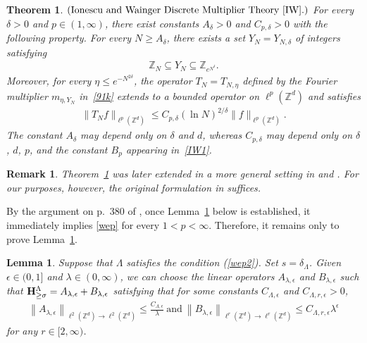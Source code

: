 \documentclass[10pt,a4paper]{amsart}
\newtheorem{theorem}{Theorem}\numberwithin{theorem}{section}
\newtheorem{lemma}{Lemma}\numberwithin{lemma}{section}
\newtheorem{remark}{Remark}\numberwithin{remark}{section}
\numberwithin{equation}{section}
\begin{document}
\begin{theorem}\label{lem82}
$(\text{Ionescu and Wainger Discrete Multiplier Theory \cite{IW}.})$ 
For every $\delta>0$ and $p\in(1,\infty)$, there exist constants
$A_{\delta}>0$ and $C_{p,\delta}>0$ with the following property.
For every $N\ge A_{\delta}$, there exists a set
$Y_N=Y_{N,\delta}$ of integers satisfying
\begin{align*}
	\mathbb{Z}_N
	\subseteq Y_N
	\subseteq \mathbb{Z}_{e^{N^\delta}}.
\end{align*}
Moreover, for every $\eta\le e^{-N^{2\delta}}$, the operator
$T_N=T_{N,\eta}$ defined by the Fourier multiplier
$m_{\eta,Y_N}$ in~\eqref{91k} extends to a bounded operator on
$\ell^p(\mathbb{Z}^d)$ and satisfies
\begin{align*}
	\|T_N f\|_{\ell^p(\mathbb{Z}^d)}
	\le
	C_{p,\delta}(\ln N)^{2/\delta}
	\|f\|_{\ell^p(\mathbb{Z}^d)}.
\end{align*}
The constant $A_{\delta}$ may depend only on $\delta$ and $d$,
whereas $C_{p,\delta}$ may depend only on $\delta$, $d$, $p$,
and the constant $B_p$ appearing in~\eqref{IW1}.
\end{theorem}

\begin{remark}
Theorem~\ref{lem82} was later extended in a more general setting in \cite{KMPW} and \cite{Tao}.
For our purposes, however, the original formulation in \cite{IW} suffices.
\end{remark}










By the argument on p.~380 of \cite{IW}, once Lemma~\ref{IW2} below is established, it immediately implies \eqref{wep} for every $1<p<\infty$.  Therefore, it remains only to prove Lemma~\ref{IW2}.




\begin{lemma}\label{IW2}
Suppose that $\Lambda$ satisfies   the  condition (\ref{wep2}). Set $s=\delta_{\Lambda}$.		Given   $\epsilon \in(0,1]$ and $\lambda \in(0, \infty)$, we can choose the linear operators $A_{\lambda, \epsilon}$ and $B_{\lambda, \epsilon}$ such that ${\bf H}_{\ge\sigma}^{\Lambda} =A_{\lambda, \epsilon} +B_{\lambda, \epsilon} $ satisfying that for some constants $C_{\Lambda,\epsilon}$ and $C_{\Lambda,r,\epsilon}>0$,
\begin{align*}
	\left\|A_{\lambda, \epsilon}\right\|_{\ell^{2}(\mathbb{Z}^d) \rightarrow \ell^{2}(\mathbb{Z}^d) } \leq \frac{C_{\Lambda,\epsilon}}{\lambda}\ \text{and}\ 
	\left\|B_{\lambda, \epsilon}\right\|_{\ell^{r}(\mathbb{Z}^d)  \rightarrow \ell^{r}(\mathbb{Z}^d) } \leq C_{\Lambda,r,\epsilon} \lambda^{\epsilon} 
\end{align*}
for any $r \in[2, \infty)$. 
\end{lemma}
\end{document}
